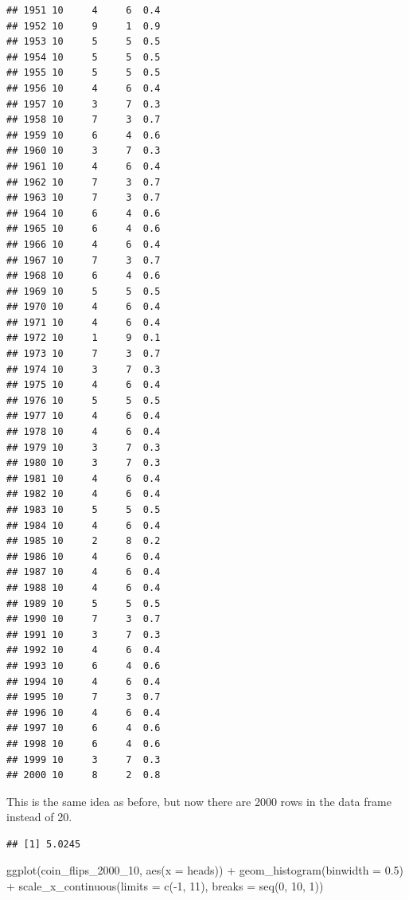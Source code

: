 \documentclass[
]{book}
\newenvironment{Shaded}{\begin{snugshade}}{\end{snugshade}}
\newcommand{\AttributeTok}[1]{\textcolor[rgb]{0.77,0.63,0.00}{#1}}
\newcommand{\DecValTok}[1]{\textcolor[rgb]{0.00,0.00,0.81}{#1}}
\newcommand{\FloatTok}[1]{\textcolor[rgb]{0.00,0.00,0.81}{#1}}
\newcommand{\FunctionTok}[1]{\textcolor[rgb]{0.00,0.00,0.00}{#1}}
\newcommand{\NormalTok}[1]{#1}
\newcommand{\SpecialCharTok}[1]{\textcolor[rgb]{0.00,0.00,0.00}{#1}}
\begin{document}
\begin{verbatim}
## 1951 10     4     6  0.4
## 1952 10     9     1  0.9
## 1953 10     5     5  0.5
## 1954 10     5     5  0.5
## 1955 10     5     5  0.5
## 1956 10     4     6  0.4
## 1957 10     3     7  0.3
## 1958 10     7     3  0.7
## 1959 10     6     4  0.6
## 1960 10     3     7  0.3
## 1961 10     4     6  0.4
## 1962 10     7     3  0.7
## 1963 10     7     3  0.7
## 1964 10     6     4  0.6
## 1965 10     6     4  0.6
## 1966 10     4     6  0.4
## 1967 10     7     3  0.7
## 1968 10     6     4  0.6
## 1969 10     5     5  0.5
## 1970 10     4     6  0.4
## 1971 10     4     6  0.4
## 1972 10     1     9  0.1
## 1973 10     7     3  0.7
## 1974 10     3     7  0.3
## 1975 10     4     6  0.4
## 1976 10     5     5  0.5
## 1977 10     4     6  0.4
## 1978 10     4     6  0.4
## 1979 10     3     7  0.3
## 1980 10     3     7  0.3
## 1981 10     4     6  0.4
## 1982 10     4     6  0.4
## 1983 10     5     5  0.5
## 1984 10     4     6  0.4
## 1985 10     2     8  0.2
## 1986 10     4     6  0.4
## 1987 10     4     6  0.4
## 1988 10     4     6  0.4
## 1989 10     5     5  0.5
## 1990 10     7     3  0.7
## 1991 10     3     7  0.3
## 1992 10     4     6  0.4
## 1993 10     6     4  0.6
## 1994 10     4     6  0.4
## 1995 10     7     3  0.7
## 1996 10     4     6  0.4
## 1997 10     6     4  0.6
## 1998 10     6     4  0.6
## 1999 10     3     7  0.3
## 2000 10     8     2  0.8
\end{verbatim}

This is the same idea as before, but now there are 2000 rows in the data frame instead of 20.

\begin{Shaded}
\end{Shaded}

\begin{verbatim}
## [1] 5.0245
\end{verbatim}

\begin{Shaded}
\begin{Highlighting}[]
\FunctionTok{ggplot}\NormalTok{(coin\_flips\_2000\_10, }\FunctionTok{aes}\NormalTok{(}\AttributeTok{x =}\NormalTok{ heads)) }\SpecialCharTok{+}
    \FunctionTok{geom\_histogram}\NormalTok{(}\AttributeTok{binwidth =} \FloatTok{0.5}\NormalTok{) }\SpecialCharTok{+}
    \FunctionTok{scale\_x\_continuous}\NormalTok{(}\AttributeTok{limits =} \FunctionTok{c}\NormalTok{(}\SpecialCharTok{{-}}\DecValTok{1}\NormalTok{, }\DecValTok{11}\NormalTok{), }\AttributeTok{breaks =} \FunctionTok{seq}\NormalTok{(}\DecValTok{0}\NormalTok{, }\DecValTok{10}\NormalTok{, }\DecValTok{1}\NormalTok{))}
\end{Highlighting}
\end{Shaded}
\end{document}
